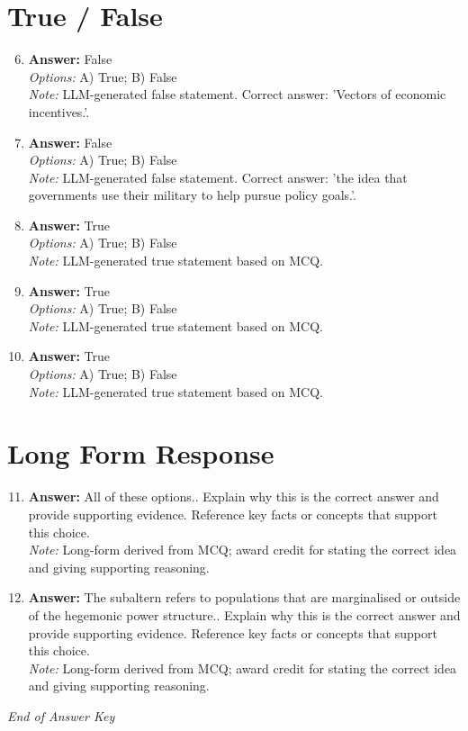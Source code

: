 \documentclass[12pt]{article}
\begin{document}
\section*{True / False}
\begin{enumerate}[label=\arabic*.]
\setcounter{enumi}{5}
\item \textbf{Answer:} False
\\ \textit{Options:} A) True; B) False
\\ \textit{Note:} LLM-generated false statement. Correct answer: 'Vectors of economic incentives.'.
\item \textbf{Answer:} False
\\ \textit{Options:} A) True; B) False
\\ \textit{Note:} LLM-generated false statement. Correct answer: 'the idea that governments use their military to help pursue policy goals.'.
\item \textbf{Answer:} True
\\ \textit{Options:} A) True; B) False
\\ \textit{Note:} LLM-generated true statement based on MCQ.
\item \textbf{Answer:} True
\\ \textit{Options:} A) True; B) False
\\ \textit{Note:} LLM-generated true statement based on MCQ.
\item \textbf{Answer:} True
\\ \textit{Options:} A) True; B) False
\\ \textit{Note:} LLM-generated true statement based on MCQ.
\end{enumerate}

\section*{Long Form Response}
\begin{enumerate}[label=\arabic*.]
\setcounter{enumi}{10}
\item \textbf{Answer:} All of these options.. Explain why this is the correct answer and provide supporting evidence. Reference key facts or concepts that support this choice.
\\ \textit{Note:} Long-form derived from MCQ; award credit for stating the correct idea and giving supporting reasoning.
\item \textbf{Answer:} The subaltern refers to populations that are marginalised or outside of the hegemonic power structure.. Explain why this is the correct answer and provide supporting evidence. Reference key facts or concepts that support this choice.
\\ \textit{Note:} Long-form derived from MCQ; award credit for stating the correct idea and giving supporting reasoning.
\end{enumerate}

\vfill
\noindent\textit{End of Answer Key}
\end{document}
